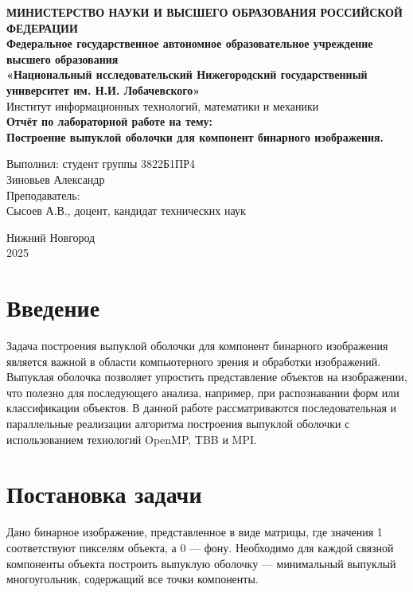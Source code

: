 \documentclass[12pt]{article}
\begin{document}
\begin{titlepage}
\begin{center}
\textbf{МИНИСТЕРСТВО НАУКИ И ВЫСШЕГО ОБРАЗОВАНИЯ РОССИЙСКОЙ ФЕДЕРАЦИИ} \\[0.5cm]
\textbf{Федеральное государственное автономное образовательное учреждение высшего образования} \\[0.5cm]
\textbf{«Национальный исследовательский Нижегородский государственный университет им. Н.И. Лобачевского»} \\[0.5cm]
Институт информационных технологий, математики и механики \\
\vfill
{\Large
\textbf{Отчёт по лабораторной работе на тему:} \\[0.5cm]
\textbf{Построение выпуклой оболочки для компонент бинарного изображения.} \\
}
\vfill
\begin{flushright}
Выполнил: студент группы 3822Б1ПР4 \\
Зиновьев Александр \\
\vspace{1cm}
Преподаватель: \\
Сысоев А.В., доцент, кандидат технических наук \\
\end{flushright}
\vfill
Нижний Новгород \\
2025
\end{center}
\end{titlepage}

\tableofcontents
\newpage

\section{Введение}
Задача построения выпуклой оболочки для компонент бинарного изображения является важной в области компьютерного зрения и обработки изображений. Выпуклая оболочка позволяет упростить представление объектов на изображении, что полезно для последующего анализа, например, при распознавании форм или классификации объектов. В данной работе рассматриваются последовательная и параллельные реализации алгоритма построения выпуклой оболочки с использованием технологий OpenMP, TBB и MPI.


\section{Постановка задачи}
Дано бинарное изображение, представленное в виде матрицы, где значения 1 соответствуют пикселям объекта, а 0 — фону. Необходимо для каждой связной компоненты объекта построить выпуклую оболочку — минимальный выпуклый многоугольник, содержащий все точки компоненты.
\end{document}
